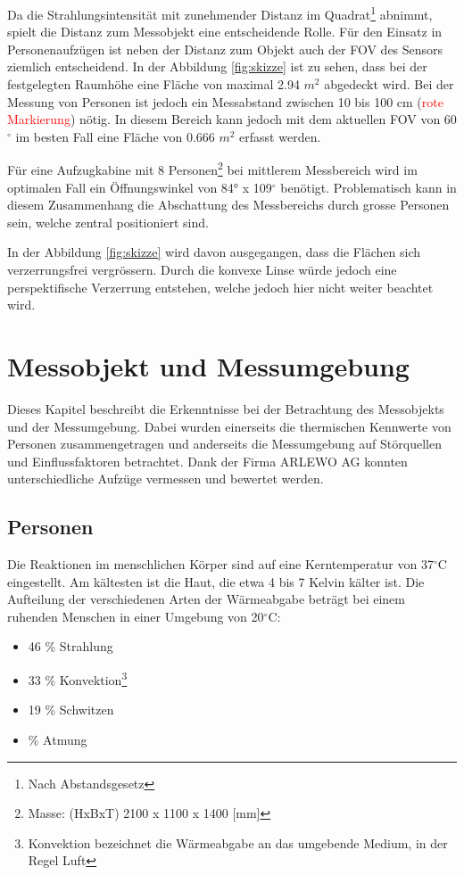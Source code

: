 Da die Strahlungsintensität mit zunehmender Distanz im Quadrat\footnote[6]{Nach Abstandsgesetz} abnimmt, spielt die Distanz zum Messobjekt eine entscheidende Rolle. Für den Einsatz in Personenaufzügen ist neben der Distanz zum Objekt auch der \ac{FOV} des Sensors ziemlich entscheidend. In der Abbildung \ref{fig:skizze} ist zu sehen, dass bei der festgelegten Raumhöhe eine Fläche von maximal 2.94 $m^2$ abgedeckt wird. Bei der Messung von Personen ist jedoch ein Messabstand zwischen 10 bis 100 cm (\textcolor{red}{rote Markierung}) nötig. In diesem Bereich kann jedoch mit dem aktuellen \ac{FOV} von 60$^\circ$ im besten Fall eine Fläche von 0.666 $m^2$ erfasst werden.

Für eine Aufzugkabine mit 8 Personen\footnote[7]{Masse: (HxBxT) 2100 x 1100 x 1400 [mm]} bei mittlerem Messbereich wird im optimalen Fall ein Öffnungswinkel von 84° x 109$^\circ$ benötigt. Problematisch kann in diesem Zusammenhang die Abschattung des Messbereichs durch grosse Personen sein, welche zentral positioniert sind.

In der Abbildung \ref{fig:skizze} wird davon ausgegangen, dass die Flächen sich verzerrungsfrei vergrössern. Durch die konvexe Linse würde jedoch eine perspektifische Verzerrung entstehen, welche jedoch hier nicht weiter beachtet wird.


\section{Messobjekt und Messumgebung}
\label{sec:Messobjekt}
Dieses Kapitel beschreibt die Erkenntnisse bei der Betrachtung des Messobjekts und der Messumgebung. Dabei wurden einerseits die thermischen Kennwerte von Personen zusammengetragen und anderseits die Messumgebung auf Störquellen und Einflussfaktoren betrachtet. Dank der Firma ARLEWO AG konnten unterschiedliche Aufzüge vermessen und bewertet werden. 

\subsection{Personen}
\label{subsec:Personen}
Die Reaktionen im menschlichen Körper sind auf eine Kerntemperatur von 37$^\circ$C eingestellt. Am kältesten ist die Haut, die etwa 4 bis 7 Kelvin  kälter ist. Die Aufteilung der verschiedenen Arten der Wärmeabgabe beträgt bei einem ruhenden Menschen in einer Umgebung von 20$^\circ$C:
\begin{itemize}
	\item 46 \% Strahlung
	\item 33 \% Konvektion\footnote[8]{Konvektion bezeichnet die Wärmeabgabe an
		das umgebende Medium, in der Regel Luft}
	\item 19 \% Schwitzen
	\item {} \% Atmung
\end{itemize}

